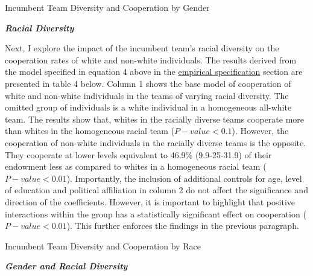 \begin{table}[H]
 \captionsetup{justification=raggedright,singlelinecheck=false}
\caption{Incumbent Team Diversity and Cooperation by Gender}
        
\end{table}

\noindent \textbf{\textit{Racial Diversity}} 

\noindent Next, I explore the impact of the incumbent team's racial diversity on the cooperation rates of white and non-white individuals. The results derived from the model specified in equation 4 above in the \hyperref[subsec:Specification]{empirical specification} section are presented in table 4 below. Column 1 shows the base model of cooperation of white and non-white individuals in the teams of varying racial diversity. The omitted group of individuals is a white individual in a homogeneous all-white team. The results show that, whites in the racially diverse teams cooperate more than whites in the homogeneous racial team ($P-value<0.1$). However, the cooperation of non-white individuals in the racially diverse teams is the opposite. They cooperate at lower levels equivalent to 46.9\% (9.9-25-31.9) of their endowment less as compared to whites in a homogeneous racial team ($P-value<0.01$). Importantly, the inclusion of additional controls for age, level of education and political affiliation in column 2 do not affect the significance and direction of the coefficients. However, it is important to highlight that positive interactions within the group has a statistically significant effect on cooperation ($P-value<0.01$). This further enforces the findings in the previous paragraph. 

\begin{table}[H]
\captionsetup{justification=raggedright,singlelinecheck=false}
\caption{Incumbent Team Diversity and Cooperation by Race}
    
        
    
\end{table}

\noindent\textbf{\textit{Gender and Racial Diversity}} 

